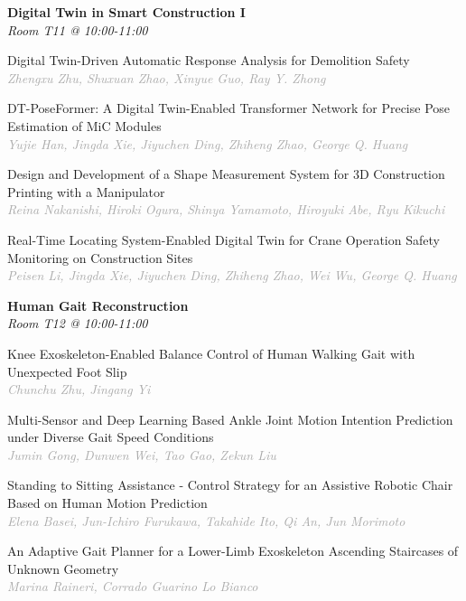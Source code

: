 \begin{multicols*}{2}
\normalsize \textbf{Digital Twin in Smart Construction I}\\
\small \textit{Room T11 @ 10:00-11:00}

\small Digital Twin-Driven Automatic Response Analysis for Demolition Safety\\ 
\footnotesize \textcolor{darkgray}{\textit{Zhengxu Zhu, Shuxuan  Zhao, Xinyue  Guo, Ray Y.  Zhong}}

\small DT-PoseFormer: A Digital Twin-Enabled Transformer Network for Precise Pose Estimation of MiC Modules\\ 
\footnotesize \textcolor{darkgray}{\textit{Yujie Han, Jingda  Xie, Jiyuchen  Ding, Zhiheng  Zhao, George Q.  Huang}}

\small Design and Development of a Shape Measurement System for 3D Construction Printing with a Manipulator\\ 
\footnotesize \textcolor{darkgray}{\textit{Reina Nakanishi, Hiroki  Ogura, Shinya  Yamamoto, Hiroyuki  Abe, Ryu  Kikuchi}}

\small Real-Time Locating System-Enabled Digital Twin for Crane Operation Safety Monitoring on Construction Sites\\ 
\footnotesize \textcolor{darkgray}{\textit{Peisen Li, Jingda  Xie, Jiyuchen  Ding, Zhiheng  Zhao, Wei  Wu, George Q.  Huang}}

\normalsize \textbf{Human Gait Reconstruction}\\
\small \textit{Room T12 @ 10:00-11:00}

\small Knee Exoskeleton-Enabled Balance Control of Human Walking Gait with Unexpected Foot Slip\\ 
\footnotesize \textcolor{darkgray}{\textit{Chunchu Zhu, Jingang  Yi}}

\small Multi-Sensor and Deep Learning Based Ankle Joint Motion Intention Prediction under Diverse Gait Speed Conditions\\ 
\footnotesize \textcolor{darkgray}{\textit{Jumin Gong, Dunwen  Wei, Tao  Gao, Zekun  Liu}}

\small Standing to Sitting Assistance - Control Strategy for an Assistive Robotic Chair Based on Human Motion Prediction\\ 
\footnotesize \textcolor{darkgray}{\textit{Elena Basei, Jun-Ichiro  Furukawa, Takahide  Ito, Qi  An, Jun  Morimoto}}

\small An Adaptive Gait Planner for a Lower-Limb Exoskeleton Ascending Staircases of Unknown Geometry\\ 
\footnotesize \textcolor{darkgray}{\textit{Marina Raineri, Corrado  Guarino Lo Bianco}}


\end{multicols*}
